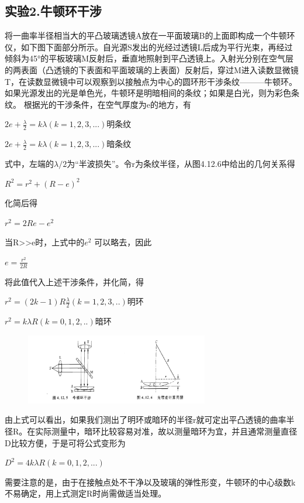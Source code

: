 \documentclass[11pt,a4paper,oneside]{article}
\begin{document}
\subsection*{实验2.牛顿环干涉}
将一曲率半径相当大的平凸玻璃透镜A放在一平面玻璃B的上面即构成一个牛顿环仪，如下图下面部分所示。自光源S发出的光经过透镜L后成为平行光束，再经过倾斜为45°的平板玻璃M反射后，垂直地照射到平凸透镜上。入射光分别在空气层的两表面（凸透镜的下表面和平面玻璃的上表面）反射后，穿过M进入读数显微镜T，在读数显微镜中可以观察到以接触点为中心的圆环形干涉条纹———牛顿环。如果光源发出的光是单色光，牛顿环是明暗相间的条纹；如果是白光，则为彩色条纹。
根据光的干涉条件，在空气厚度为e的地方，有
\begin{center}
$2e + \displaystyle\frac{\lambda }{2} = k\lambda (k = 1,2,3,...) 明条纹 $
\end{center}
\begin{center}
$ 2e + \displaystyle\frac{\lambda }{2} = k\lambda (k = 1,2,3,...)暗条纹$
\end{center}
式中，左端的$\lambda / 2 $为“半波损失”。令r为条纹半径，从图4.12.6中给出的几何关系得
\begin{center}
$ R^{2} = r^{2}+(R - e)^2$
\end{center}
化简后得
\begin{center}
$ r^{2} = 2Re - e^{2}$
\end{center}
当R>>e时，上式中的$e^{2}$ 可以略去，因此
\begin{center}
$ e = \displaystyle\frac{r^2}{2R}$
\end{center}
将此值代入上述干涉条件，并化简，得
\begin{center}
$r^2 = (2k -1)R\displaystyle\frac{\lambda }{2}(k = 1,2,3,..) 明环$
\end{center}
\begin{center}
$r^2 = k\lambda R(k = 0,1,2,..) 暗环$
\end{center}

\begin{figure}[htbp]
 \centering
  \includegraphics[width=8cm]{Image/牛顿环干涉&光程差计算用图.png}
\end{figure}
由上式可以看出，如果我们测出了明环或暗环的半径r就可定出平凸透镜的曲率半径R。在实际测量中，暗环比较容易对准，故以测量暗环为宜，并且通常测量直径D比较方便，于是可将公式变形为
\begin{center}
$ D^2 = 4k\lambda R(k = 0,1,2,...)$
\end{center}
需要注意的是，由于在接触点处不干净以及玻璃的弹性形变，牛顿环的中心级数k不易确定，用上式测定R时尚需做适当处理。
\end{document}
